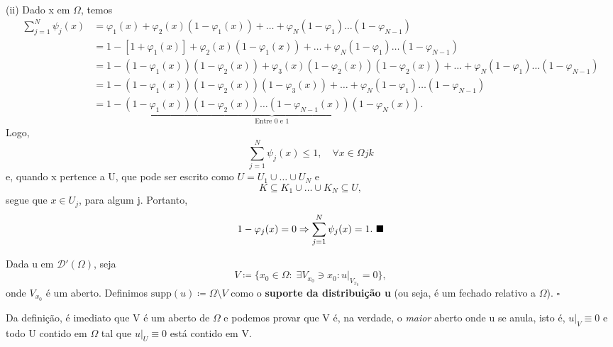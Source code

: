 \documentclass[../distribution_theory_notes.tex]{subfiles}
\begin{document}
\begin{proof*}
	(ii) Dado x em \(\Omega \), temos
	\begin{align*}
		\sum\limits_{j=1}^{N}\psi_{j}(x) & = \varphi_1(x)+\varphi_2(x)(1-\varphi_1(x)) + \dotsc +\varphi_N(1-\varphi_1)\dotsc (1-\varphi_{N-1})                                           \\
		                                 & = 1-[1+\varphi_1(x)] + \varphi_2(x)(1-\varphi_1(x))+ \dotsc +\varphi_N(1-\varphi_1)\dotsc (1-\varphi_{N-1})                                    \\
		                                 & = 1- (1-\varphi_1(x))(1-\varphi_2(x)) + \varphi_3(x)(1-\varphi_2(x))(1-\varphi_2(x)) + \dotsc + \varphi_N(1-\varphi_1)\dotsc (1-\varphi_{N-1}) \\
		                                 & = 1-(1-\varphi_1(x))(1-\varphi_2(x))(1-\varphi_3(x)) + \dotsc + \varphi_{N} (1-\varphi_1)\dotsc (1-\varphi_{N-1})                              \\
		                                 & = 1-\underbrace{(1-\varphi_1(x))(1-\varphi_2(x))\dotsc (1-\varphi_{N-1}(x))(1-\varphi_{N}(x))}_{\text{Entre 0 e 1}}.
	\end{align*}
	Logo,
	\[
		\sum\limits_{j=1}^{N}\psi_{j}(x)\leq 1,\quad \forall x\in \Omega jk
	\]
	e, quando x pertence a U, que pode ser escrito como \(U=U_1\cup \dotsc \cup U_{N}\) e
	\[
		K\subseteq K_1\cup \dotsc \cup K_{N} \subseteq U,
	\]
	segue que \(x\in U_{j}\), para algum j. Portanto,
	\[
		1-\varphi_{j}(x)=0 \Rightarrow \sum\limits_{j=1}^{N}\psi_{j}(x)=1. \text{ $\blacksquare$}
	\]
\end{proof*}
\begin{def*}
	Dada u em \(\mathcal{D}'(\Omega )\), seja
	\[
		V \coloneqq \{x_{0}\in \Omega:\; \exists V_{x_{0}}\ni x_{0}: u|_{V_{x_{0}}}=0\},
	\]
	onde \(V_{x_{0}}\) é um aberto. Definimos \(\mathrm{supp}(u)\coloneqq \Omega \setminus{V}\) como o \textbf{suporte da distribuição u} (ou seja, é um fechado relativo a \(\Omega \)). \(\square\)
\end{def*}
Da definição, é imediato que V é um aberto de \(\Omega \) e podemos provar que V é, na verdade, o \textit{maior} aberto onde u se anula, isto é, \(u|_{V}\equiv 0\) e todo U contido em \(\Omega \) tal que \(u|_{U}\equiv 0\) está contido em V.
\end{document}
